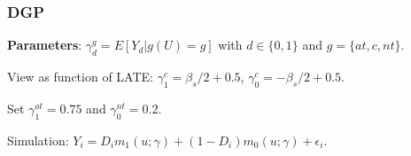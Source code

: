 \documentclass[11pt, aspectratio=169]{beamer}
\begin{document}












\begin{frame}
    \frametitle{DGP}

    \textbf{Parameters}: $\gamma_d^g = E[Y_d|g(U)=g]$ with $d\in\{0,1\}$ and $g = \{at, c, nt\}$.

    \vspace{0.5cm}

    View as function of LATE\@: $\gamma_1^c = \beta_s/2 + 0.5$, $\gamma_0^c = -\beta_s/2 + 0.5$.

    \vspace{0.5cm}

    Set $\gamma_1^{at} = 0.75$ and $\gamma_0^{nt} = 0.2$.

    \vspace{0.5cm}

    Simulation: $Y_i = D_i m_1(u;\gamma) + (1-D_i)m_0(u;\gamma) + \epsilon_i$.


\end{frame}
\end{document}
